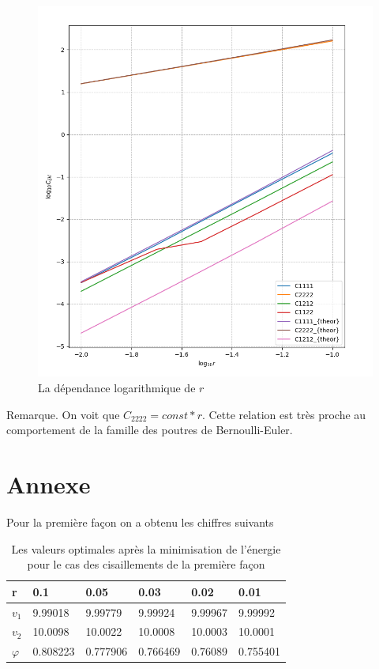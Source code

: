 \documentclass{article}
\begin{document}
\begin{figure}[H]
    \begin{center}
        \includegraphics[width=0.8\linewidth]{img/Abaqus_CDP2.png}
    \end{center}
    \caption{La dépendance logarithmique de $r$}
\end{figure}

Remarque. On voit que $C_{2222} = const * r$. Cette relation est très proche au comportement de la famille des poutres de Bernoulli-Euler.  

\section{Annexe}

Pour la première façon on a obtenu les chiffres suivants 
\begin{table}[H]
    \begin{tabular}{|l|l|l|l|l|l|}
    \hline
     r&  0.1   &  0.05 &  0.03     &  0.02    &  0.01 \\ \hline
     $v_1$ &  9.99018  &  9.99779 &  9.99924  &  9.99967 &  9.99992 \\ \hline
     $v_2$  &  10.0098  &  10.0022 &  10.0008  &  10.0003 &  10.0001 \\ \hline
     $\varphi$ &  0.808223 &  0.777906&  0.766469 &  0.76089 &  0.755401\\ \hline
    \end{tabular}
    \caption{Les valeurs optimales après la minimisation de l'énergie pour le cas des cisaillements de la première façon}
\end{table}
\end{document}
